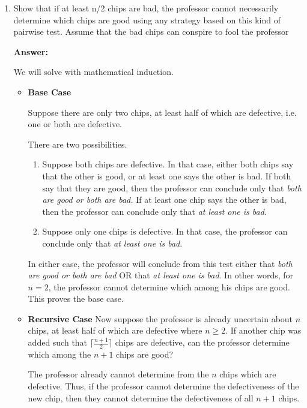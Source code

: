 \documentclass[]{book}
\theoremstyle{definition}
\begin{document}
\begin{enumerate}[label=\alph*.]
    \item Show that if at least n/2 chips are bad, the professor cannot necessarily determine
          which chips are good using any strategy based on this kind of pairwise test.
          Assume that the bad chips can conspire to fool the professor

    \textbf{Answer:} 

    We will solve with mathematical induction. 
   
    \begin{itemize}
        \item \textbf{Base Case}
        
        Suppose there are only two chips, at least half
        of which are defective, i.e. one or both are defective.

        There are two possibilities.
        \begin{enumerate}
            \item Suppose both chips are defective. In that case, either both chips say that the
            other is good, or at least one says the other is bad. If both say that they are good,
            then the professor can conclude only that \textit{both are good or both are bad.}
            If at least one chip says the other is bad, then the professor can conclude only that 
            \textit{at least one is bad}.

            \item Suppose only one chips is defective. 
            In that case, the professor can conclude only that
            \textit{at least one is bad}.
        \end{enumerate}

        In either case, the professor will conclude from this test either that
        \textit{both are good or both are bad} OR that \textit{at least one is bad}.
        In other words, for $n=2$, the professor cannot determine which among his chips are good.
        This proves the base case.

        \item \textbf{Recursive Case} 
        Now suppose the professor is already uncertain about $n$ chips, at least half of which are
        defective where $n \geq 2$. If another chip was added such that $\lceil \frac{n+1}{2} \rceil$ chips are defective,
        can the professor determine which among the $n+1$ chips are good?

        The professor already cannot determine from the $n$ chips which are defective. Thus, if the professor
        cannot determine the defectiveness of the new chip, then they cannot determine the
        defectiveness of all $n+1$ chips.


\end{itemize}
\end{enumerate}
\end{document}
